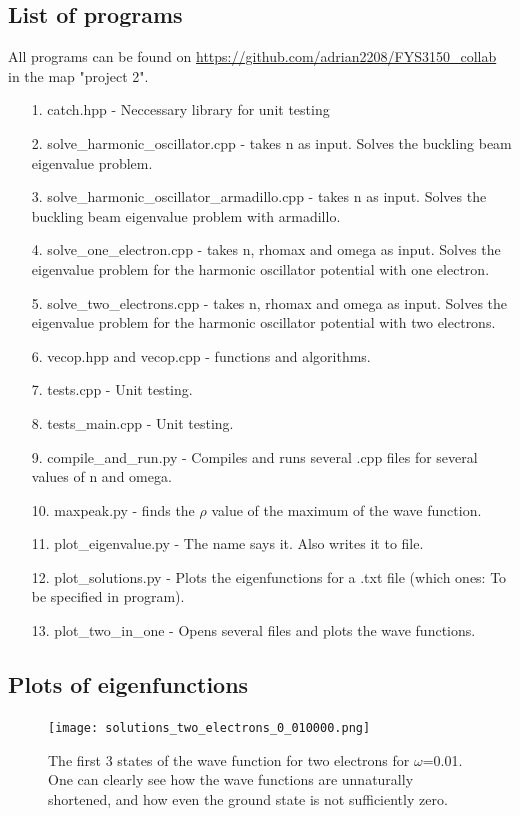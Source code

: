 \documentclass[10pt,a4paper]{article}
\begin{document}
\subsection{List of programs}
All programs can be found on \url{https://github.com/adrian2208/FYS3150_collab} in the map "project 2".
\begin{itemize}
\item[1.] catch.hpp - Neccessary library for unit testing
\item[2.] solve\_harmonic\_oscillator.cpp - takes n as input. Solves the buckling beam eigenvalue problem.
\item[3.] solve\_harmonic\_oscillator\_armadillo.cpp - takes n as input. Solves the buckling beam eigenvalue problem with armadillo.
\item[4.] solve\_one\_electron.cpp - takes n, rhomax and omega as input. Solves the eigenvalue problem for the harmonic oscillator potential with one electron.
\item[5.] solve\_two\_electrons.cpp -  takes n, rhomax and omega as input. Solves the eigenvalue problem for the harmonic oscillator potential with two electrons.
\item[6.] vecop.hpp and vecop.cpp - functions and algorithms.
\item[7.] tests.cpp - Unit testing.
\item[8.] tests\_main.cpp - Unit testing.
\item[9.] compile\_and\_run.py - Compiles and runs several .cpp files for several values of n and omega.
\item[10.] maxpeak.py - finds the $\rho$ value of the maximum of the wave function.
\item[11.] plot\_eigenvalue.py - The name says it. Also writes it to file.
\item[12.] plot\_solutions.py - Plots the eigenfunctions for a .txt file (which ones: To be specified in program).
\item[13.] plot\_two\_in\_one - Opens several files and plots the wave functions.
\end{itemize}

\subsection {Plots of eigenfunctions}
\begin{figure}[H]
	\texttt{[image: solutions\_two\_electrons\_0\_010000.png]}
	\caption[Approximated first 3 states for two electrons for $\omega$=0.01]{The first 3 states of the wave function for two electrons for $\omega$=0.01. One can clearly see how the wave functions are unnaturally shortened, and how even the ground state is not sufficiently zero.}
\end{figure}
\end{document}
